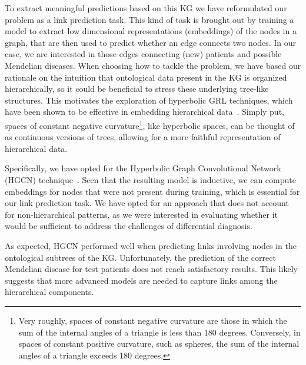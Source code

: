 \documentclass[11pt]{article}
\begin{document}
To extract meaningful predictions based on this KG we have reformulated our problem as a link prediction task. This kind of task is brought out by training a model to extract low dimensional representations (embeddings) of the nodes in a graph, that are then used to predict whether an edge connects two nodes. In our case, we are interested in those edges connecting (new) patients and possible Mendelian diseases. When choosing how to tackle the problem, we have based our rationale on the intuition that ontological data present in the KG is organized hierarchically, so it could be beneficial to stress these underlying tree-like structures. This motivates the exploration of hyperbolic GRL techniques, which have been shown to be effective in embedding hierarchical data~\cite{nickel2017Poincare}. Simply put, spaces of constant negative curvature\footnote{Very roughly, spaces of constant negative curvature are those in which the sum of the internal angles of a triangle is less than 180 degrees. Conversely, in spaces of constant positive curvature, such as spheres, the sum of the internal angles of a triangle exceeds 180 degrees.}, like hyperbolic spaces, can be thought of as continuous versions of trees, allowing for a more faithful representation of hierarchical data.

Specifically, we have opted for the Hyperbolic Graph Convolutional Network (HGCN) technique~\cite{chami2019HGCN}. Seen that the resulting model is inductive, we can compute embeddings for nodes that were not present during training, which is essential for our link prediction task. We have opted for an approach that does not account for non-hierarchical patterns, as we were interested in evaluating whether it would be sufficient to address the challenges of differential diagnosis. 

As expected, HGCN performed well when predicting links involving nodes in the ontological subtrees of the KG. Unfortunately, the prediction of the correct Mendelian disease for test patients does not reach satisfactory results. This likely suggests that more advanced models are needed to capture links among the hierarchical components.


 
{

\footnotesize

}
\end{document}
